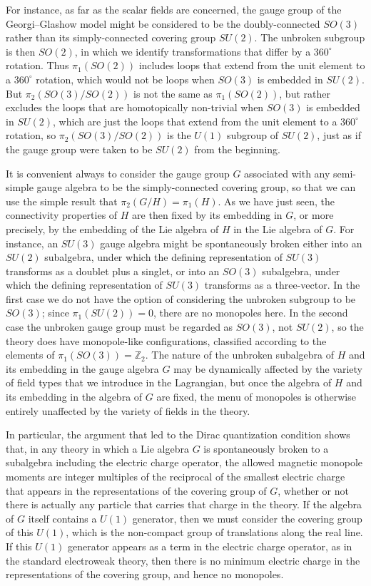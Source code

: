 For instance, as far as the scalar fields are concerned, the gauge group
of the Georgi--Glashow model might be considered to be the
doubly-connected $SO(3)$ rather than its simply-connected covering group
$SU(2)$. The unbroken subgroup is then $SO(2)$, in which we identify
transformations that differ by a $360^\circ$ rotation. Thus
$\pi_1(SO(2))$ includes loops that extend from the unit element to a
$360^\circ$ rotation, which would not be loops when $SO(3)$ is embedded
in $SU(2)$. But $\pi_2(SO(3)/SO(2))$ is not the same as
$\pi_1(SO(2))$, but rather excludes the loops that are homotopically
non-trivial when $SO(3)$ is embedded in $SU(2)$, which are just the loops
that extend from the unit element to a $360^\circ$ rotation, so
$\pi_2(SO(3)/SO(2))$ is the $U(1)$ subgroup of $SU(2)$, just as if the
gauge group were taken to be $SU(2)$ from the beginning.

It is convenient always to consider the gauge group $G$ associated with
any semi-simple gauge algebra to be the simply-connected covering group,
so that we can use the simple result that $\pi_2(G/H)=\pi_1(H)$. As we
have just seen, the connectivity properties of $H$ are then fixed by its
embedding in $G$, or more precisely, by the embedding of the Lie algebra
of $H$ in the Lie algebra of $G$. For instance, an $SU(3)$ gauge algebra
might be spontaneously broken either into an $SU(2)$ subalgebra, under
which the defining representation of $SU(3)$ transforms as a doublet plus
a singlet, or into an $SO(3)$ subalgebra, under which the defining
representation of $SU(3)$ transforms as a three-vector. In the first case
we do not have the option of considering the unbroken subgroup to be
$SO(3)$; since $\pi_1(SU(2))=0$, there are no monopoles here. In the
second case the unbroken gauge group must be regarded as $SO(3)$, not
$SU(2)$, so the theory does have monopole-like configurations, classified
according to the elements of $\pi_1(SO(3))=\mathbb Z_2$. The nature of
the unbroken subalgebra of $H$ and its embedding in the gauge algebra $G$
may be dynamically affected by the variety of field types that we
introduce in the Lagrangian, but once the algebra of $H$ and its embedding
in the algebra of $G$ are fixed, the menu of monopoles is otherwise
entirely unaffected by the variety of fields in the theory.

In particular, the argument that led to the Dirac quantization condition
shows that, in any theory in which a Lie algebra $G$ is spontaneously
broken to a subalgebra including the electric charge operator, the allowed
magnetic monopole moments are integer multiples of the reciprocal of the
smallest electric charge that appears in the representations of the
covering group of $G$, whether or not there is actually any particle that
carries that charge in the theory. If the algebra of $G$ itself contains a
$U(1)$ generator, then we must consider the covering group of this
$U(1)$, which is the non-compact group of translations along the real
line. If this $U(1)$ generator appears as a term in the electric charge
operator, as in the standard electroweak theory, then there is no minimum
electric charge in the representations of the covering group, and hence
no monopoles.
